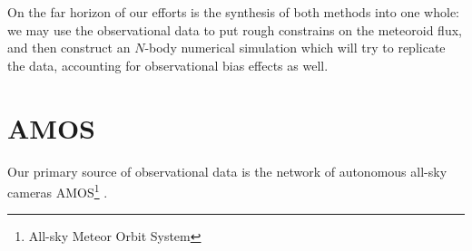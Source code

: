     On the far horizon of our efforts is the synthesis of both methods into one whole:
    we may use the observational data to put rough constrains on the meteoroid flux,
    and then construct an $N$-body numerical simulation which will try to replicate the data,
    accounting for observational bias effects as well.

\section{AMOS} \label{iA}
    Our primary source of observational data is the network of autonomous all-sky cameras
    AMOS\footnote{All-sky Meteor Orbit System} \citep{zigo+2013}.

